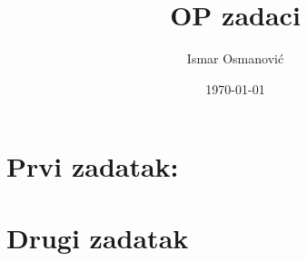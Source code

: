 \documentclass[a4paper, 12pt]{article}
\title{\huge OP zadaci}
\author{Ismar Osmanović}
\date{\today}
\begin{document}
\maketitle

\section {Prvi zadatak:}



\section {Drugi zadatak}
\end{document}
